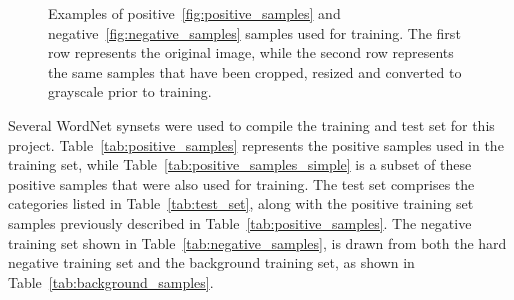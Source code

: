 \documentclass{llncs}
\begin{document}
{{			\begin{figure}
				\centering
				\qquad
				\caption{Examples of positive~\ref{fig:positive_samples} and negative~\ref{fig:negative_samples} samples used for training. The first row represents the original image, while the second row represents the same samples that have been cropped, resized and converted to grayscale prior to training.}
				\label{fig:samples}
			\end{figure}

			Several WordNet synsets were used to compile the training and test set for this project. Table~\ref{tab:positive_samples} represents the positive samples used in the training set, while Table~\ref{tab:positive_samples_simple} is a subset of these positive samples that were also used for training. The test set comprises the categories listed in Table~\ref{tab:test_set}, along with the positive training set samples previously described in Table~\ref{tab:positive_samples}. The negative training set shown in Table~\ref{tab:negative_samples}, is drawn from both the hard negative training set and the background training set, as shown in Table~\ref{tab:background_samples}.

}}
\end{document}
